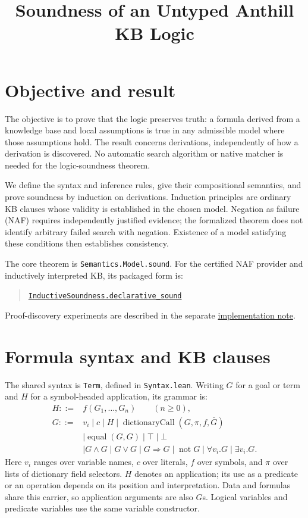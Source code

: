 \documentclass[11pt]{article}
\title{Soundness of an Untyped Anthill KB Logic}
\author{}
\date{}
\newcommand{\naf}{\mathop{\mathrm{not}}}
\begin{document}
\maketitle

\section{Objective and result}
The objective is to prove that the logic preserves truth: a formula derived from
a knowledge base and local assumptions is true in any admissible model where
those assumptions hold. The result concerns derivations, independently of how
a derivation is discovered. No automatic search algorithm or native matcher is
needed for the logic-soundness theorem.

We define the syntax and inference rules, give their compositional semantics,
and prove soundness by induction on derivations. Induction principles are
ordinary KB clauses whose validity is established in the chosen model.
Negation as failure (NAF) requires independently justified evidence; the
formalized theorem does not identify arbitrary failed search with negation.
Existence of a model satisfying these conditions then establishes consistency.

The core theorem is \texttt{Semantics.Model.sound}. For the certified NAF
provider and inductively interpreted KB, its packaged form is:
\begin{quote}
\href{AnthillModKbSpec/Resolution/InductiveSoundness.lean}{\texttt{InductiveSoundness.declarative\_sound}}
\end{quote}
Proof-discovery experiments are described in the separate
\href{docs/implementation.md}{implementation note}.

\section{Formula syntax and KB clauses}
The shared syntax is \texttt{Term}, defined in \texttt{Syntax.lean}.
Writing $G$ for a goal or term and $H$ for a symbol-headed application, its grammar is:
\[
\begin{aligned}
 H ::= {}& f(G_1,\ldots,G_n)\qquad(n\geq 0),\\
 G ::= {}& v_i \mid c \mid H
       \mid \operatorname{dictionaryCall}(G,\pi,f,\bar G)\\
       &\mid \operatorname{equal}(G,G) \mid \top \mid \bot\\
       &\mid G\land G \mid G\lor G \mid G\Rightarrow G
        \mid \naf G \mid \forall v_i.G \mid \exists v_i.G.
\end{aligned}
\]
Here $v_i$ ranges over variable names, $c$ over literals, $f$ over symbols, and
$\pi$ over lists of dictionary field selectors. $H$ denotes an application;
its use as a predicate or an operation depends on its position and interpretation.
Data and formulas share this carrier, so application arguments are also $G$s.
Logical variables and predicate variables use the same variable constructor.
\end{document}
